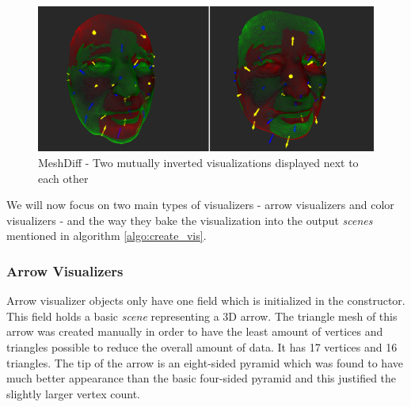 \begin{figure}[h]
\centering
	\includegraphics[width=\textwidth]{./img/mesh_diff-inverted_vis.png}
    \caption[MeshDiff - Two mutually inverted visualizations]{MeshDiff - Two mutually inverted visualizations displayed next to each other}
    \label{fig:meshdiff-inverted_vis}
\end{figure}

We will now focus on two main types of visualizers - arrow visualizers and color visualizers - and the way they bake the visualization into the output {\it scenes} mentioned in algorithm \ref{algo:create_vis}.

\subsubsection{Arrow Visualizers}

Arrow visualizer objects only have one field which is initialized in the constructor. This field holds a basic {\it scene} representing a 3D arrow. The triangle mesh of this arrow was created manually in order to have the least amount of vertices and triangles possible to reduce the overall amount of data. It has 17 vertices and 16 triangles. The tip of the arrow is an eight-sided pyramid which was found to have much better appearance than the basic four-sided pyramid and this justified the slightly larger vertex count.

